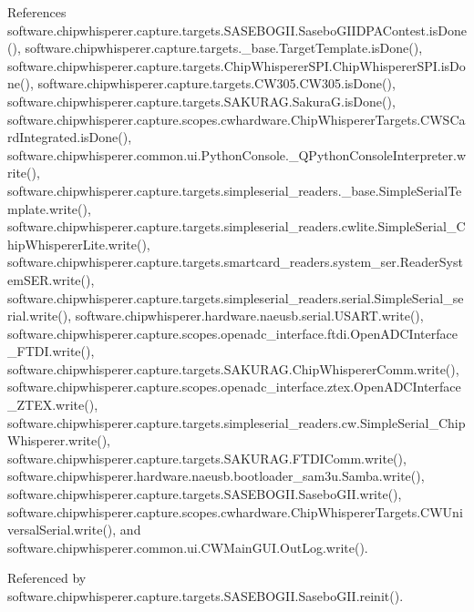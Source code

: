 References software.\+chipwhisperer.\+capture.\+targets.\+S\+A\+S\+E\+B\+O\+G\+I\+I.\+Sasebo\+G\+I\+I\+D\+P\+A\+Contest.\+is\+Done(), software.\+chipwhisperer.\+capture.\+targets.\+\_\+base.\+Target\+Template.\+is\+Done(), software.\+chipwhisperer.\+capture.\+targets.\+Chip\+Whisperer\+S\+P\+I.\+Chip\+Whisperer\+S\+P\+I.\+is\+Done(), software.\+chipwhisperer.\+capture.\+targets.\+C\+W305.\+C\+W305.\+is\+Done(), software.\+chipwhisperer.\+capture.\+targets.\+S\+A\+K\+U\+R\+A\+G.\+Sakura\+G.\+is\+Done(), software.\+chipwhisperer.\+capture.\+scopes.\+cwhardware.\+Chip\+Whisperer\+Targets.\+C\+W\+S\+Card\+Integrated.\+is\+Done(), software.\+chipwhisperer.\+common.\+ui.\+Python\+Console.\+\_\+\+Q\+Python\+Console\+Interpreter.\+write(), software.\+chipwhisperer.\+capture.\+targets.\+simpleserial\+\_\+readers.\+\_\+base.\+Simple\+Serial\+Template.\+write(), software.\+chipwhisperer.\+capture.\+targets.\+simpleserial\+\_\+readers.\+cwlite.\+Simple\+Serial\+\_\+\+Chip\+Whisperer\+Lite.\+write(), software.\+chipwhisperer.\+capture.\+targets.\+smartcard\+\_\+readers.\+system\+\_\+ser.\+Reader\+System\+S\+E\+R.\+write(), software.\+chipwhisperer.\+capture.\+targets.\+simpleserial\+\_\+readers.\+serial.\+Simple\+Serial\+\_\+serial.\+write(), software.\+chipwhisperer.\+hardware.\+naeusb.\+serial.\+U\+S\+A\+R\+T.\+write(), software.\+chipwhisperer.\+capture.\+scopes.\+openadc\+\_\+interface.\+ftdi.\+Open\+A\+D\+C\+Interface\+\_\+\+F\+T\+D\+I.\+write(), software.\+chipwhisperer.\+capture.\+targets.\+S\+A\+K\+U\+R\+A\+G.\+Chip\+Whisperer\+Comm.\+write(), software.\+chipwhisperer.\+capture.\+scopes.\+openadc\+\_\+interface.\+ztex.\+Open\+A\+D\+C\+Interface\+\_\+\+Z\+T\+E\+X.\+write(), software.\+chipwhisperer.\+capture.\+targets.\+simpleserial\+\_\+readers.\+cw.\+Simple\+Serial\+\_\+\+Chip\+Whisperer.\+write(), software.\+chipwhisperer.\+capture.\+targets.\+S\+A\+K\+U\+R\+A\+G.\+F\+T\+D\+I\+Comm.\+write(), software.\+chipwhisperer.\+hardware.\+naeusb.\+bootloader\+\_\+sam3u.\+Samba.\+write(), software.\+chipwhisperer.\+capture.\+targets.\+S\+A\+S\+E\+B\+O\+G\+I\+I.\+Sasebo\+G\+I\+I.\+write(), software.\+chipwhisperer.\+capture.\+scopes.\+cwhardware.\+Chip\+Whisperer\+Targets.\+C\+W\+Universal\+Serial.\+write(), and software.\+chipwhisperer.\+common.\+ui.\+C\+W\+Main\+G\+U\+I.\+Out\+Log.\+write().



Referenced by software.\+chipwhisperer.\+capture.\+targets.\+S\+A\+S\+E\+B\+O\+G\+I\+I.\+Sasebo\+G\+I\+I.\+reinit().



